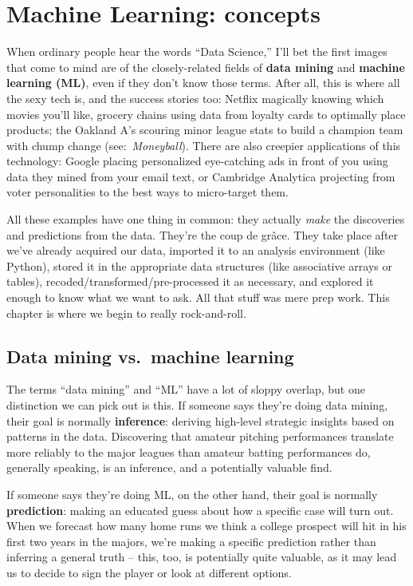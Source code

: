 
\chapter{Machine Learning: concepts}

When ordinary people hear the words ``Data Science,'' I'll bet the first images
that come to mind are of the closely-related fields of \textbf{data mining} and
\textbf{machine learning (ML)}, even if they don't know those terms. After all,
this is where all the sexy tech is, and the success stories too: Netflix
magically knowing which movies you'll like, grocery chains using data from
loyalty cards to optimally place products; the Oakland A's scouring minor
league stats to build a champion team with chump change
(see:~\textit{Moneyball}). There are also creepier applications of this
technology: Google placing personalized eye-catching ads in front of you using
data they mined from your email text, or Cambridge Analytica projecting from
voter personalities to the best ways to micro-target them.

All these examples have one thing in common: they actually \textit{make} the
discoveries and predictions from the data. They're the coup de gr\^{a}ce. They
take place after we've already acquired our data, imported it to an analysis
environment (like Python), stored it in the appropriate data structures (like
associative arrays or tables), recoded/transformed/pre-processed it as
necessary, and explored it enough to know what we want to ask. All that stuff
was mere prep work. This chapter is where we begin to really rock-and-roll.

\section{Data mining vs.~machine learning}

The terms ``data mining'' and ``ML'' have a lot of sloppy overlap, but one
distinction we can pick out is this. If someone says they're doing data mining,
their goal is normally \textbf{inference}: deriving high-level strategic
insights based on patterns in the data. Discovering that amateur pitching
performances translate more reliably to the major leagues than amateur batting
performances do, generally speaking, is an inference, and a potentially
valuable find.

If someone says they're doing ML, on the other hand, their goal is normally
\textbf{prediction}: making an educated guess about how a specific case will
turn out. When we forecast how many home runs we think a college prospect will
hit in his first two years in the majors, we're making a specific prediction
rather than inferring a general truth -- this, too, is potentially quite
valuable, as it may lead us to decide to sign the player or look at different
options.


